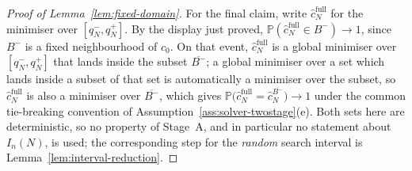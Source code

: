 \documentclass[11pt]{article}
\theoremstyle{plain}
\theoremstyle{definition}
\theoremstyle{remark}
\newcommand{\PP}{\mathbb{P}}
\begin{document}
\begin{proof}[Proof of Lemma~\ref{lem:fixed-domain}]
For the final claim, write $\widehat c_N^{\mathrm{full}}$ for the minimiser
over $[q_N^-,q_N^+]$. By the display just proved,
$\PP(\widehat c_N^{\mathrm{full}}\in B^-)\to1$, since $B^-$ is a fixed
neighbourhood of $c_0$. On that event, $\widehat c_N^{\mathrm{full}}$ is a
global minimiser over $[q_N^-,q_N^+]$ that lands inside the subset
$\overline{B^-}$; a global minimiser over a set which lands inside a subset of
that set is automatically a minimiser over the subset, so
$\widehat c_N^{\mathrm{full}}$ is also a minimiser over $\overline{B^-}$,
which gives
$\PP\bigl(\widehat c_N^{\mathrm{full}}=\widehat c_N^{\overline{B^-}}\bigr)
\to1$ under the common tie-breaking convention of
Assumption~\ref{ass:solver-twostage}(e). Both sets here are deterministic, so
no property of Stage~A, and in particular no statement about $I_n(N)$, is
used; the corresponding step for the \emph{random} search interval is
Lemma~\ref{lem:interval-reduction}.
\end{proof}
\end{document}
